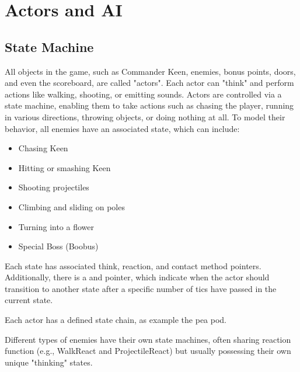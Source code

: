 \documentclass[book.tex]{subfiles}
\begin{document}
\section{Actors and AI}
\label{section:actors_and_ai}

\subsection{State Machine}
All objects in the game, such as Commander Keen, enemies, bonus points, doors, and even the scoreboard, are called "actors". Each actor can "think" and perform actions like walking, shooting, or emitting sounds. Actors are controlled via a state machine, enabling them to take actions such as chasing the player, running in various directions, throwing objects, or doing nothing at all. To model their behavior, all enemies have an associated state, which can include:
\begin{itemize}
  \item Chasing Keen
  \item Hitting or smashing Keen
  \item Shooting projectiles
  \item Climbing and sliding on poles
  \item Turning into a flower
  \item Special Boss (Boobus)
\end{itemize}

\par
Each state has associated think, reaction, and contact method pointers. Additionally, there is a  and  pointer, which indicate when the actor should transition to another state after a specific number of tics have passed in the current state.\\

\par
\begin{minipage}{\textwidth}
  
\end{minipage}
\label{state_type}
\par

Each actor has a defined state chain, as example the pea pod. \\
\par
\begin{minipage}{\textwidth}

\end{minipage}

\par
Different types of enemies have their own state machines, often sharing reaction function (e.g., WalkReact and ProjectileReact) but usually possessing their own unique "thinking" states.\\
\end{document}
